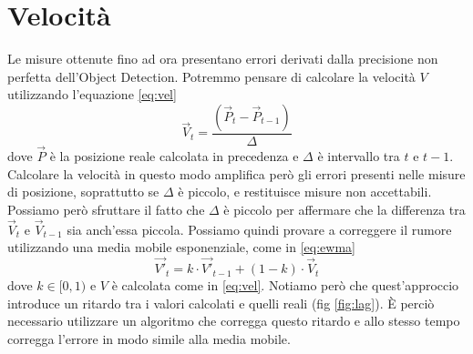 \chapter{Velocità}
\label{sec:velocita}

Le misure ottenute fino ad ora presentano errori derivati dalla precisione non perfetta dell'Object Detection.
Potremmo pensare di  calcolare la velocità $V$ utilizzando l'equazione \ref{eq:vel}
\begin{equation}
    \label{eq:vel}
    \vec{V}_t = \frac{(\vec{P}_t - \vec{P}_{t-1})}{\Delta}
\end{equation}
dove $\vec{P}$ è la posizione reale calcolata in precedenza e $\Delta$ è intervallo tra $t$ e $t-1$.
Calcolare la velocità in questo modo amplifica però gli errori presenti nelle misure di posizione, soprattutto se $\Delta$ è piccolo, e restituisce misure non accettabili.
Possiamo però sfruttare il fatto che $\Delta$ è piccolo per affermare che la differenza tra $\vec{V}_t$ e $\vec{V}_{t-1}$ sia anch'essa piccola.
Possiamo quindi provare a correggere il rumore utilizzando una media mobile esponenziale, come in \ref{eq:ewma}
\begin{equation}
    \label{eq:ewma}
    \vec{V'}_t = k \cdot \vec{V'}_{t-1} + (1-k) \cdot \vec{V}_t
\end{equation}
dove $k \in [0, 1)$ e $V$ è calcolata come in \ref{eq:vel}.
Notiamo però che quest'approccio introduce un ritardo tra i valori calcolati e quelli reali (fig \ref{fig:lag}).
È perciò necessario utilizzare un algoritmo che corregga questo ritardo e allo stesso tempo corregga l'errore in modo simile alla media mobile.

